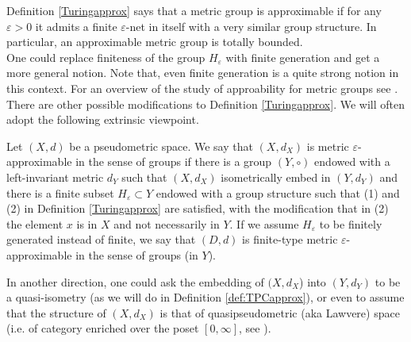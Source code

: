 Definition \ref{Turingapprox} says that a metric group is approximable if for any $\varepsilon>0$ it admits a finite $\varepsilon$-net in itself with a very similar group structure. In particular, an approximable metric group is totally bounded.\\
One could replace finiteness of the group $H_\varepsilon$ with finite generation and get a more general notion. Note that, even finite generation is a quite strong notion in this context. For an overview of the study of approability for metric groups see \cite{Thom:approx}. \\


There are other possible modifications to Definition \ref{Turingapprox}. We will often adopt the following extrinsic viewpoint. \begin{dfn}
    Let $(X,d)$ be a pseudometric space. We say that $(X,d_X)$ is metric $\varepsilon$-approximable in the sense of groups if there is a group $(Y,\circ)$ endowed with a left-invariant metric $d_Y$ such that $(X,d_X)$ isometrically embed in $(Y,d_Y)$ and there is a finite subset $H_\varepsilon\subset Y$ endowed with a group structure such that (1) and (2) in Definition \ref{Turingapprox} are satisfied, with the modification that in (2) the element $x$ is in $X$ and not necessarily in $Y$. If we assume $H_\varepsilon$ to be finitely generated instead of finite, we say that $(D,d)$ is finite-type metric $\varepsilon$-approximable in the sense of groups (in $Y$).

\end{dfn}
In another direction, one could ask the embedding of $(X,d_X$) into $(Y,d_Y)$ to be a quasi-isometry (as we will do in Definition \ref{def:TPCapprox}), or even to assume that the structure of $(X,d_X)$ is that of quasipseudometric (aka Lawvere) space (i.e. of category enriched over the poset $[0,\infty]$, see \cite{Fong_Spivak_2019}).


